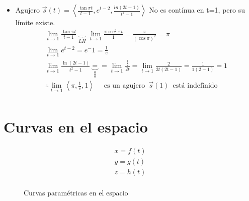 \documentclass{article}
\begin{document}
\begin{itemize}
    \item Agujero $\vec{s}(t) = \left\langle \frac{\tan \pi t }{t-1} , e^{t-2}, \frac{ln(2t-1)}{t^2-1}  \right\rangle $ \newline 
     No es contínua en t=1, pero su límite existe.
     \begin{align*}
         \lim_{t \to 1} \frac{\tan \pi t}{t-1} \underbrace{=}_{LH} \lim_{t \to 1} \frac{\pi \sec^2 \pi t }{1} = \frac{\pi}{(\cos \pi)^2} = \pi \\ 
        \lim_{t \to 1} e^{t-2 } = e^-1 = \frac{1}{e} \\ 
        \lim_{t \to 1} \frac{\ln(2t-1)}{t^2-1} \underbrace{=}_{\frac{0}{0}} = \lim_{t \to 1} \frac{\frac{1}{2} }{2t} = \lim_{t \to 1} \frac{2}{2t(2t-1)} = \frac{1}{1(2-1)} = 1 \\ 
        \therefore \lim_{t \to 1} \left\langle \pi, \frac{1}{e}, 1 \right\rangle \quad \text{  es un agujero   } \, \vec{s}(1) \, \text{  está indefinido  } \\   
     \end{align*}
\end{itemize}


\section{Curvas en el espacio}

\begin{align*}
    x = f(t) \\ 
    y = g(t) \\ 
    z = h(t) \\ 
\end{align*}
\begin{figure}[htbp]
    \centering
    \caption{Curvas paramétricas en el espacio}
    \label{}
\end{figure}

\end{document}
